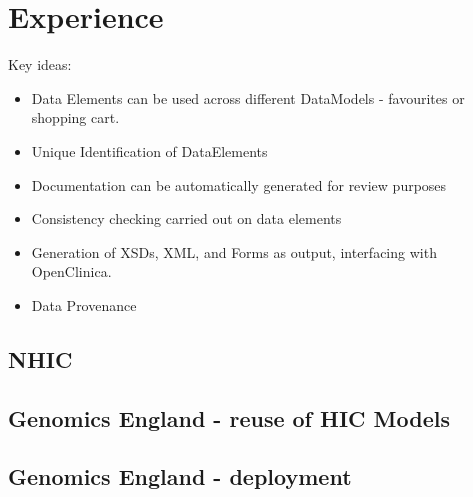 \section{Experience}


Key ideas:

\begin{itemize}
	\item Data Elements can be used across different DataModels - favourites or shopping cart.
	\item Unique Identification of DataElements 
	\item Documentation can be automatically generated for review purposes
	\item Consistency checking carried out on data elements
	\item Generation of XSDs, XML, and Forms as output, interfacing with OpenClinica.
	\item Data Provenance
\end{itemize}


\subsection{NHIC}

\subsection{Genomics England - reuse of HIC Models}

\subsection{Genomics England -  deployment}
